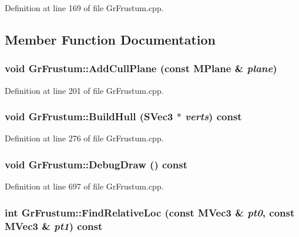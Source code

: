 \begin{CompactItemize}
Definition at line 169 of file GrFrustum.cpp.

\subsection{Member Function Documentation}
\hypertarget{class_gr_frustum_c711031f75c591aa9810cff76178e8b1}{
\subsubsection[{AddCullPlane}]{\setlength{\rightskip}{0pt plus 5cm}void GrFrustum::AddCullPlane (const {\bf MPlane} \& {\em plane})}}
\label{class_gr_frustum_c711031f75c591aa9810cff76178e8b1}




Definition at line 201 of file GrFrustum.cpp.\hypertarget{class_gr_frustum_a8381a57041f73df26588232ce5e94a3}{
\subsubsection[{BuildHull}]{\setlength{\rightskip}{0pt plus 5cm}void GrFrustum::BuildHull ({\bf SVec3} $\ast$ {\em verts}) const}}
\label{class_gr_frustum_a8381a57041f73df26588232ce5e94a3}




Definition at line 276 of file GrFrustum.cpp.\hypertarget{class_gr_frustum_daebcc27d64029d4749d2f3f08b373ac}{
\subsubsection[{DebugDraw}]{\setlength{\rightskip}{0pt plus 5cm}void GrFrustum::DebugDraw () const}}
\label{class_gr_frustum_daebcc27d64029d4749d2f3f08b373ac}




Definition at line 697 of file GrFrustum.cpp.\hypertarget{class_gr_frustum_c1d108b681015b4c01a7327302a86b6e}{
\subsubsection[{FindRelativeLoc}]{\setlength{\rightskip}{0pt plus 5cm}int GrFrustum::FindRelativeLoc (const {\bf MVec3} \& {\em pt0}, \/  const {\bf MVec3} \& {\em pt1}) const}}
\label{class_gr_frustum_c1d108b681015b4c01a7327302a86b6e}





\end{CompactItemize}
